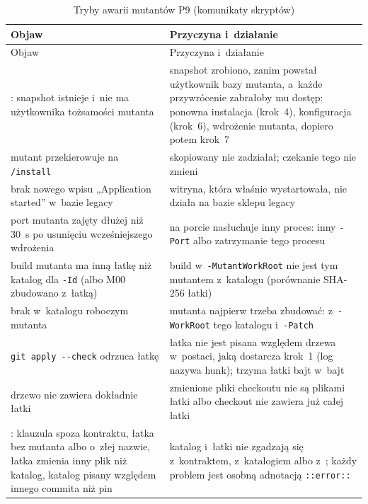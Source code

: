 {\footnotesize
\begin{xltabular}{\linewidth}{@{}>{\raggedright\arraybackslash}X >{\raggedright\arraybackslash}X@{}}
\caption{Tryby awarii mutantów P9 (komunikaty skryptów)}\label{tab:bench-mutanty-awarie}\\
\toprule
Objaw & Przyczyna i~działanie \\
\midrule
\endfirsthead
\toprule
Objaw & Przyczyna i~działanie \\
\midrule
\endhead
\bottomrule
\endlastfoot
{}: snapshot istnieje i~nie ma użytkownika tożsamości mutanta &
  snapshot zrobiono, zanim powstał użytkownik bazy mutanta, a~każde przywrócenie zabrałoby
  mu dostęp: ponowna instalacja (krok~4), konfiguracja (krok~6), wdrożenie mutanta, dopiero
  potem krok~7 \\
mutant przekierowuje na \texttt{/install} & skopiowany  nie
  zadziałał; czekanie tego nie zmieni \\
brak nowego wpisu „Application started” w~bazie legacy & witryna, która właśnie
  wystartowała, nie działa na bazie sklepu legacy \\
port mutanta zajęty dłużej niż 30~s po usunięciu wcześniejszego wdrożenia & na porcie
  nasłuchuje inny proces: inny \texttt{-Port} albo zatrzymanie tego procesu \\
build mutanta ma inną łatkę niż katalog dla \texttt{-Id} (albo M00 zbudowano z~łatką) &
  build w~\texttt{-MutantWorkRoot} nie jest tym mutantem z~katalogu (porównanie SHA-256
  łatki) \\
brak  w~katalogu roboczym mutanta & mutanta najpierw trzeba zbudować:
   z~\texttt{-WorkRoot} tego katalogu i~\texttt{-Patch} \\
\texttt{git apply -{}-check} odrzuca łatkę & łatka nie jest pisana względem drzewa
  w~postaci, jaką dostarcza krok~1 (log nazywa hunk);  trzyma łatki
  bajt w~bajt \\
drzewo nie zawiera dokładnie łatki & zmienione pliki checkoutu nie są plikami łatki albo
  checkout nie zawiera już całej łatki \\
: klauzula spoza kontraktu, łatka bez mutanta albo o~złej nazwie,
  łatka zmienia inny plik niż katalog, katalog pisany względem innego commita niż pin &
  katalog i~łatki nie zgadzają się z~kontraktem, z~katalogiem albo z~; każdy
  problem jest osobną adnotacją \texttt{::error::} \\

\end{xltabular}}

